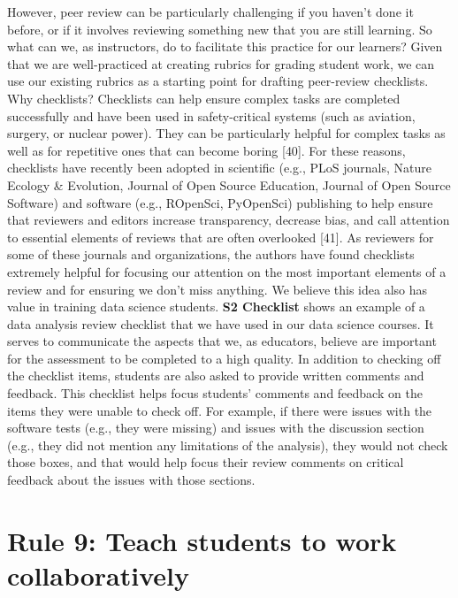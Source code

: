\documentclass[
  10pt,
  letterpaper,
]{article}
\begin{document}
However, peer review can be particularly challenging if you haven't done
it before, or if it involves reviewing something new that you are still
learning. So what can we, as instructors, do to facilitate this practice
for our learners? Given that we are well-practiced at creating rubrics
for grading student work, we can use our existing rubrics as a starting
point for drafting peer-review checklists. Why checklists? Checklists
can help ensure complex tasks are completed successfully and have been
used in safety-critical systems (such as aviation, surgery, or nuclear
power). They can be particularly helpful for complex tasks as well as
for repetitive ones that can become boring {[}40{]}. For these reasons,
checklists have recently been adopted in scientific (e.g., PLoS
journals, Nature Ecology \& Evolution, Journal of Open Source Education,
Journal of Open Source Software) and software (e.g., ROpenSci,
PyOpenSci) publishing to help ensure that reviewers and editors increase
transparency, decrease bias, and call attention to essential elements of
reviews that are often overlooked {[}41{]}. As reviewers for some of
these journals and organizations, the authors have found checklists
extremely helpful for focusing our attention on the most important
elements of a review and for ensuring we don't miss anything. We believe
this idea also has value in training data science students. \textbf{S2
Checklist} shows an example of a data analysis review checklist that we
have used in our data science courses. It serves to communicate the
aspects that we, as educators, believe are important for the assessment
to be completed to a high quality. In addition to checking off the
checklist items, students are also asked to provide written comments and
feedback. This checklist helps focus students' comments and feedback on
the items they were unable to check off. For example, if there were
issues with the software tests (e.g., they were missing) and issues with
the discussion section (e.g., they did not mention any limitations of
the analysis), they would not check those boxes, and that would help
focus their review comments on critical feedback about the issues with
those sections.

\section{Rule 9: Teach students to work
collaboratively}\label{sec-rule9}
\end{document}
